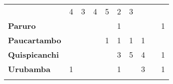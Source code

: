 \begin{tabular}{lccccccccc}
	&4 											&3
	&4											&5
	&2											&3\\
	\textbf{Paruro}                            
    &\cellcolor[HTML]{FCC46C}   				&\cellcolor[HTML]{FCC46C} 					&\cellcolor[HTML]{FCC46C}		 			&\cellcolor[HTML]{FCC46C}					
	&1
	&\cellcolor[HTML]{FCC46C}					&\cellcolor[HTML]{FCC46C}
	&\cellcolor[HTML]{FCC46C} 					&1\\
	\textbf{Paucartambo}               		                       					
	&\cellcolor[HTML]{FCC46C}					&\cellcolor[HTML]{FCC46C}                   &\cellcolor[HTML]{FCC46C} 					&1
	&1											&1		
	&1											&\cellcolor[HTML]{FCC46C}
	&\cellcolor[HTML]{FCC46C}\\
	\textbf{Quispicanchi}                                         	                  		
	&\cellcolor[HTML]{FCC46C}					&\cellcolor[HTML]{FCC46C} 
	&\cellcolor[HTML]{FCC46C}					&\cellcolor[HTML]{FCC46C}
	&3											&5
	&4											&\cellcolor[HTML]{FCC46C}
	&1\\
	\textbf{Urubamba}                                                          		
	&1
	&\cellcolor[HTML]{FCC46C}					&\cellcolor[HTML]{FCC46C}
	&\cellcolor[HTML]{FCC46C}					&1
	&\cellcolor[HTML]{FCC46C}					&3
	&\cellcolor[HTML]{FCC46C}					&1
	\\	
	&\multicolumn{1}{l}{}                       &\multicolumn{1}{l}{}            &\multicolumn{1}{l}{}                         
	&\multicolumn{1}{l}{}                       &\multicolumn{1}{l}{}            &\multicolumn{1}{l}{}                       &\multicolumn{1}{l}{}                       &\multicolumn{1}{l}{}            &\multicolumn{1}{l}{}    
\end{tabular}